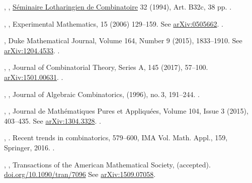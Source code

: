 \documentclass[12pt]{amsart}
\theoremstyle{plain}
\theoremstyle{definition}
\theoremstyle{remark}
\begin{document}
\begin{thebibliography}{10}
,
,
\href{http://www.mat.univie.ac.at/~slc/}{S\'eminaire Lotharingien de Combinatoire} 32 (1994), 
Art. B32c, 38 pp. .

,
,
Experimental Mathematics, 15 (2006) 129--159.
See \href{https://arxiv.org/abs/math/0505662}{arXiv:0505662}. .

,
Duke Mathematical Journal, 
Volume 164, Number 9 (2015), 1833--1910.
See \href{https://arxiv.org/pdf/1204.4533.pdf}{arXiv:1204.4533}. .

,
,
Journal of Combinatorial Theory, Series A, 145 (2017), 57--100.
\href{https://arxiv.org/pdf/1501.00631.pdf}{arXiv:1501.00631}. .

  ,
 , 
 Journal of Algebraic Combinatorics,  (1996), no.\,3, 191--244. .

,
,
Journal de Math\'ematiques Pures et Appliqu\'ees,
Volume 104, Issue 3 (2015),  403--435.
See \href{http://arxiv.org/abs/1304.3328}{arXiv:1304.3328}.  .

,
. 
Recent trends in combinatorics, 579--600, IMA Vol. Math. Appl., 159, Springer, 2016. .


, 
,  
Transactions of the American Mathe\-matical Society, (accepted).
\href{https://doi.org/10.1090/tran/7096}{doi.org/10.1090/tran/7096} 
See \href{http://arxiv.org/abs/1509.07058}{arXiv:1509.07058}.


\end{thebibliography}
\end{document}
